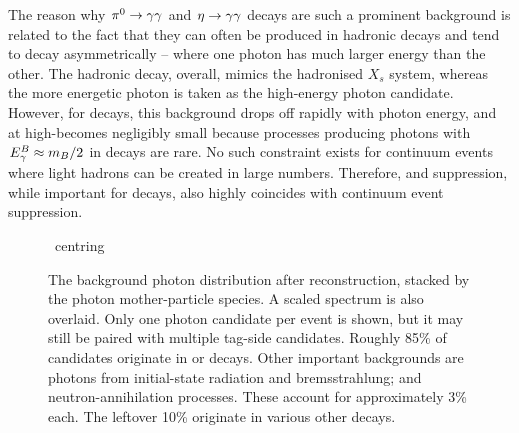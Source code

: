 The reason why $\pi^0\rightarrow\gamma\gamma$ and $\eta\rightarrow\gamma\gamma$ decays are such a prominent background is related to the fact that they can often be produced in hadronic decays and tend to decay asymmetrically -- where one photon has much larger energy than the other.
The hadronic decay, overall, mimics the hadronised $X_s$ system, whereas the more energetic photon is taken as the high-energy photon candidate.
However, for \B decays, this background drops off rapidly with photon energy, and at high-\EB becomes negligibly small because processes producing photons with ${E^B_{\gamma}}\approx m_B/2$ in \B decays are rare.
No such constraint exists for continuum events where light hadrons can be created in large numbers.
Therefore, \piz and \eta suppression, while important for \B decays, also highly coincides with continuum event suppression.

\begin{figure}[htbp!]
    \ centring
    \caption{\label{fig:photon_sources} The background photon distribution after reconstruction, stacked by the photon mother-particle species.
    A scaled \BtoXsgamma spectrum is also overlaid.
    Only one photon candidate per event is shown, but it may still be paired with multiple tag-side candidates.
    Roughly 85\% of candidates originate in \pi\ra\g\g or \eta\ra\g\g decays.
    Other important backgrounds are photons from initial-state radiation and bremsstrahlung; and neutron-annihilation processes.
    These account for approximately 3\% each.
    The leftover 10\% originate in various other decays.}
\end{figure}


